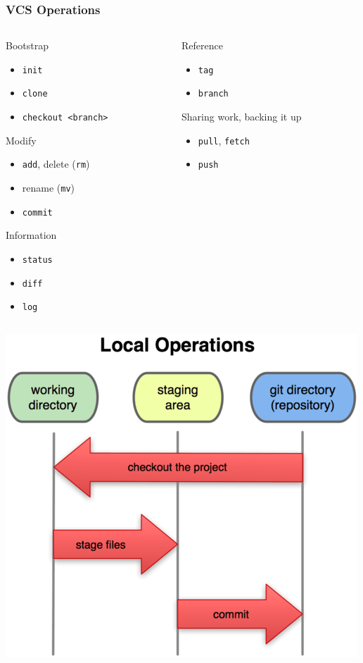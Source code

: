 \documentclass[english,compress]{beamer}
\newcommand{\cw}{\texttt} %
\begin{document}
\frame
{
    \frametitle{VCS Operations}
        \begin{columns}
            \begin{column}{.5\textwidth}
        Bootstrap
            \begin{itemize}
                \item \cw{init}
                \item \cw{clone}
                \item \cw{checkout <branch>}
            \end{itemize}
        Modify
        \begin{itemize}
            \item \cw{add}, delete (\cw{rm})
			\item rename (\cw{mv})
            \item \cw{commit}
        \end{itemize}
         Information
        \begin{itemize}
            \item \cw{status}
            \item \cw{diff}
            \item \cw{log}
        \end{itemize}
   \end{column}
    \begin{column}{.5\textwidth}
        Reference
        \begin{itemize}
            \item \cw{tag}
            \item \cw{branch}
        \end{itemize}
        Sharing work, backing it up
\begin{itemize}
    \item \cw{pull}, \cw{fetch}
    \item \cw{push}
\end{itemize}

    \end{column}
\end{columns}

}
\frame
{
    \begin{center}
        \includegraphics[width=.8\textwidth]{figs/sections.png}
    \end{center}
}
\end{document}
